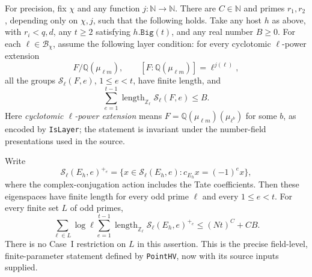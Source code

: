 \documentclass[11pt,a4paper]{article}
\theoremstyle{definition}
\begin{document}
For precision, fix \(\chi\) and any function
\(j:\mathbb N\longrightarrow\mathbb N\).  There are
\(C\in\mathbb N\) and primes \(r_1,r_2\), depending only on
\(\chi,j\), such that the following holds.  Take any host \(h\) as
above, with \(r_i<q,d\), any \(t\ge2\) satisfying
\(h.\texttt{Big}(t)\), and any real number \(B\ge0\).
For each \(\ell\in\mathcal B_\chi\), assume the following layer
condition: for every cyclotomic \(\ell\)-power extension
\[
 F/\mathbb Q(\mu_{\ell m}),\qquad
 [F:\mathbb Q(\mu_{\ell m})]=\ell^{j(\ell)},
\]
all the groups \(\mathcal S_\ell(F,e)\), \(1\le e<t\), have finite
length, and
\begin{equation}\label{eq:host-layer-premise}
 \sum_{e=1}^{t-1}\operatorname{length}_{\mathbb Z_\ell}
                 \mathcal S_\ell(F,e)\le B.
\end{equation}
Here \emph{cyclotomic \(\ell\)-power extension} means
\(F=\mathbb Q(\mu_{\ell m})(\mu_{\ell^b})\) for some \(b\), as
encoded by \texttt{IsLayer}; the statement is invariant under the
number-field presentations used in the source.

Write
\[
 \mathcal S_\ell(E_h,e)^{+_e}
 =\{x\in\mathcal S_\ell(E_h,e):c_{E_h}x=(-1)^e x\},
\]
where the complex-conjugation action includes the Tate coefficients.
Then these eigenspaces have finite length for every odd prime \(\ell\)
and every \(1\le e<t\).  For every finite set \(L\) of odd primes,
\begin{equation}\label{eq:host-point-bound}
 \sum_{\ell\in L}\log\ell\sum_{e=1}^{t-1}
 \operatorname{length}_{\mathbb Z_\ell}
       \mathcal S_\ell(E_h,e)^{+_e}
 \le (Nt)^C+CB.
\end{equation}
There is no Case~I restriction on \(L\) in this assertion.  This is
the precise field-level, finite-parameter statement defined by
\texttt{PointHV}, now with its source inputs supplied.
\end{document}
